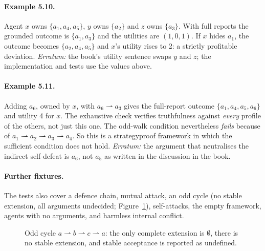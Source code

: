 \documentclass[11pt,a4paper]{article}
\newcommand{\attacks}{\rightharpoonup}
\begin{document}
\paragraph{Example 5.10.}
Agent $x$ owns $\{a_1,a_4,a_5\}$, $y$ owns $\{a_2\}$ and $z$ owns $\{a_3\}$. With full reports the grounded outcome is $\{a_1,a_3\}$ and the utilities are $(1,0,1)$. If $x$ hides $a_1$, the outcome becomes $\{a_2,a_4,a_5\}$ and $x$'s utility rises to 2: a strictly profitable deviation. \emph{Erratum:} the book's utility sentence swaps $y$ and $z$; the implementation and tests use the values above.

\paragraph{Example 5.11.}
Adding $a_6$, owned by $x$, with $a_6\attacks a_3$ gives the full-report outcome $\{a_1,a_4,a_5,a_6\}$ and utility 4 for $x$. The exhaustive check verifies truthfulness against \emph{every} profile of the others, not just this one. The odd-walk condition nevertheless \emph{fails} because of $a_1\attacks a_2\attacks a_3\attacks a_4$. So this is a strategyproof framework in which the sufficient condition does not hold. \emph{Erratum:} the argument that neutralises the indirect self-defeat is $a_6$, not $a_5$ as written in the discussion in the book.

\paragraph{Further fixtures.}
The tests also cover a defence chain, mutual attack, an odd cycle (no stable extension, all arguments undecided; Figure~\ref{fig:oddcycle}), self-attacks, the empty framework, agents with no arguments, and harmless internal conflict.

\begin{figure}[H]
\centering
{}
\caption{Odd cycle $a\attacks b\attacks c\attacks a$: the only complete extension is $\emptyset$, there is no stable extension, and stable acceptance is reported as undefined.}
\label{fig:oddcycle}
\end{figure}
\end{document}
